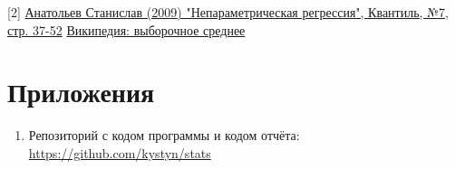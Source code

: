 [2]
\href{http://quantile.ru/07/07-SA.pdf}{Анатольев Станислав (2009) "Непараметрическая регрессия", Квантиль, №7, стр. 37-52} \href{https://ru.wikipedia.org/wiki/%D0%92%D1%8B%D0%B1%D0%BE%D1%80%D0%BE%D1%87%D0%BD%D0%BE%D0%B5_%D1%81%D1%80%D0%B5%D0%B4%D0%BD%D0%B5%D0%B5}{Википедия: выборочное среднее}

\section{Приложения}

\begin{enumerate}
	\item Репозиторий с кодом программы и кодом отчёта: \href{https://github.com/kystyn/stats}{https://github.com/kystyn/stats}
\end{enumerate}


